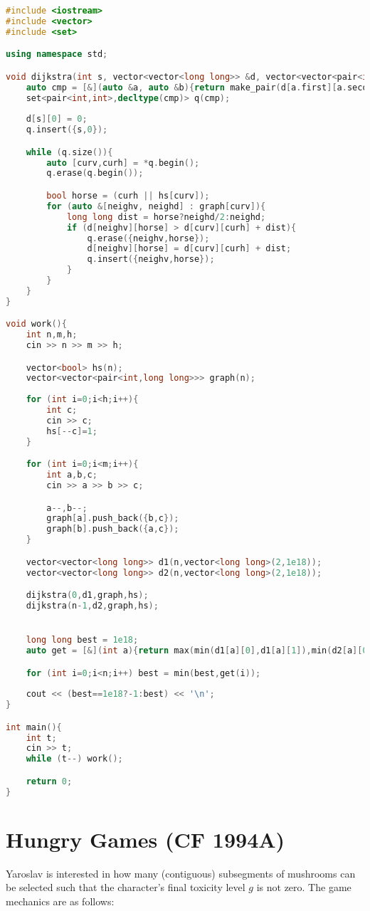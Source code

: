 \documentclass[11pt]{article}
\newcommand{\br}{\\\;\\} %
\begin{document}
\begin{lstlisting}[language=C++]
#include <iostream>
#include <vector>
#include <set>

using namespace std;

void dijkstra(int s, vector<vector<long long>> &d, vector<vector<pair<int,long long>>> &graph, vector<bool> &hs){
    auto cmp = [&](auto &a, auto &b){return make_pair(d[a.first][a.second],a) < make_pair(d[b.first][b.second],b);};
    set<pair<int,int>,decltype(cmp)> q(cmp);
    
    d[s][0] = 0;
    q.insert({s,0});

    while (q.size()){
        auto [curv,curh] = *q.begin();
        q.erase(q.begin());

        bool horse = (curh || hs[curv]);
        for (auto &[neighv, neighd] : graph[curv]){
            long long dist = horse?neighd/2:neighd;
            if (d[neighv][horse] > d[curv][curh] + dist){
                q.erase({neighv,horse});
                d[neighv][horse] = d[curv][curh] + dist;
                q.insert({neighv,horse});
            }
        }
    }
}

void work(){
    int n,m,h;
    cin >> n >> m >> h;

    vector<bool> hs(n);
    vector<vector<pair<int,long long>>> graph(n);
    
    for (int i=0;i<h;i++){
        int c;
        cin >> c;
        hs[--c]=1;
    }

    for (int i=0;i<m;i++){
        int a,b,c;
        cin >> a >> b >> c;

        a--,b--;
        graph[a].push_back({b,c});
        graph[b].push_back({a,c});
    }

    vector<vector<long long>> d1(n,vector<long long>(2,1e18));
    vector<vector<long long>> d2(n,vector<long long>(2,1e18));

    dijkstra(0,d1,graph,hs);
    dijkstra(n-1,d2,graph,hs);


    long long best = 1e18;
    auto get = [&](int a){return max(min(d1[a][0],d1[a][1]),min(d2[a][0],d2[a][1]));};

    for (int i=0;i<n;i++) best = min(best,get(i));
    
    cout << (best==1e18?-1:best) << '\n';
}

int main(){
    int t;
    cin >> t;
    while (t--) work();

    return 0;
}
\end{lstlisting}

\section{Hungry Games (CF 1994A)}
Yaroslav is interested in how many (contiguous) subsegments of mushrooms can be selected such that the character's final toxicity level $g$ is not zero. The game mechanics are as follows:\br
\end{document}
